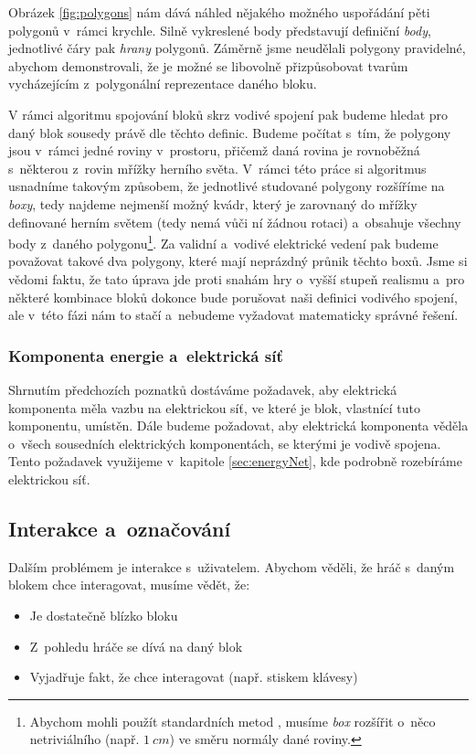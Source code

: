\FloatBarrier

Obrázek \ref{fig:polygons} nám dává náhled nějakého možného uspořádání pěti polygonů v~rámci krychle. Silně vykreslené body představují definiční \textit{body}, jednotlivé čáry pak \textit{hrany} polygonů. Záměrně jsme neudělali polygony pravidelné, abychom demonstrovali, že je možné se libovolně přizpůsobovat tvarům vycházejícím z~polygonální reprezentace daného bloku.


V rámci algoritmu spojování bloků skrz vodivé spojení pak budeme hledat pro daný blok sousedy právě dle těchto definic. Budeme počítat s~tím, že polygony jsou v~rámci jedné roviny v~prostoru, přičemž daná rovina je rovnoběžná s~některou z~rovin mřížky herního světa. V~rámci této práce si algoritmus usnadníme takovým způsobem, že jednotlivé studované polygony rozšíříme na \textit{boxy}, tedy najdeme nejmenší možný kvádr, který je zarovnaný do mřížky definované herním světem (tedy nemá vůči ní žádnou rotaci) a~obsahuje všechny body z~daného polygonu\footnote{Abychom mohli použít standardních metod , musíme \textit{box} rozšířit o~něco netriviálního (např. $1~cm$) ve směru normály dané roviny.}. Za validní a~vodivé elektrické vedení pak budeme považovat takové dva polygony, které mají neprázdný průnik těchto boxů. Jsme si vědomi faktu, že tato úprava jde proti snahám hry o~vyšší stupeň realismu a~pro některé kombinace bloků dokonce bude porušovat naši definici vodivého spojení, ale v~této fázi nám to stačí a~nebudeme vyžadovat matematicky správné řešení.

\subsubsection{Komponenta energie a~elektrická síť}
Shrnutím předchozích poznatků dostáváme požadavek, aby elektrická komponenta měla vazbu na elektrickou síť, ve které je blok, vlastnící tuto komponentu, umístěn. Dále budeme požadovat, aby elektrická komponenta věděla o~všech sousedních elektrických komponentách, se kterými je vodivě spojena. Tento požadavek využijeme v~kapitole \ref{sec:energyNet}, kde podrobně rozebíráme elektrickou síť. 



\subsection{Interakce a~označování}
\label{subsec:interaction}

Dalším problémem je interakce s~uživatelem. Abychom věděli, že hráč s~daným blokem chce interagovat, musíme vědět, že:
\begin{itemize}
	\item Je dostatečně blízko bloku
	\item Z~pohledu hráče se dívá na daný blok 
	\item Vyjadřuje fakt, že chce interagovat (např. stiskem klávesy)
\end{itemize}




